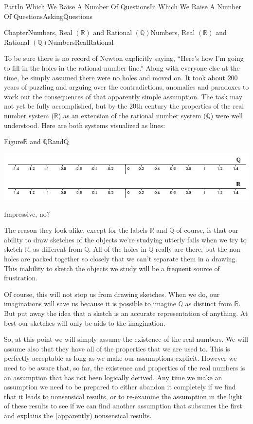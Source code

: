 \documentclass[oneside,10pt,]{book}
\numberwithin{equation}{part}
\newcommand{\RR}{\mathbb {R}}
\newcommand{\QQ}{\mathbb {Q}}
\begin{document}
\begin{partptx}{Part}{In Which We Raise A Number Of Questions}{}{In Which We Raise A Number Of Questions}{}{}{AskingQuestions}
\begin{chapterptx}{Chapter}{Numbers, Real \(\left(\RR\right)\) and Rational \(\left(\QQ\right)\)}{}{Numbers, Real \(\left(\RR\right)\) and Rational \(\left(\QQ\right)\)}{}{}{NumbersRealRational}
\par
To be sure there is no record of Newton explicitly saying, ``Here's how I'm going to fill in the holes in the rational number line.'' Along with everyone else at the time, he simply assumed there were no holes and moved on.  It took about \(200\) years of puzzling and arguing over the contradictions, anomalies and paradoxes to work out the consequences of that apparently simple assumption.  The task may not yet be fully accomplished, but by the 20th century the properties of the real number system (\(\RR\)) as an extension of the rational number system (\(\QQ\)) were well understood.  Here are both systems visualized as lines:%
\begin{figureptx}{Figure}{\(\RR\) and \(\QQ\)}{RandQ}{}%
\begin{image}{0}{1}{0}{}%
\includegraphics[width=\linewidth]{external/images/RandQ.png}
\end{image}%
\tcblower
\end{figureptx}%
Impressive, no?%
\par
The reason they look alike, except for the labels \(\RR\) and \(\QQ\) of course, is that our ability to draw sketches of the objects we're studying utterly fails when we try to sketch \(\RR\), as different from \(\QQ\).  All of the holes in \(\QQ\) really are there, but the non-holes are packed together so closely that we can't separate them in a drawing. This inability to sketch the objects we study will be a frequent source of frustration.%
\par
Of course, this will not stop us from drawing sketches.  When we do, our imaginations will save us because it is possible to imagine \(\QQ\) as distinct from \(\RR\).  But put away the idea that a sketch is an accurate representation of anything.  At best our sketches will only be aids to the imagination.%
\par
So, at this point we will simply assume the existence of the real numbers.  We will assume also that they have all of the properties that we are used to.  This is perfectly acceptable as long as we make our assumptions explicit.  However we need to be aware that, so far, the existence and properties of the real numbers is an assumption that has not been logically derived.  Any time we make an assumption we need to be prepared to either abandon it completely if we find that it leads to nonsensical results, or to re-examine the assumption in the light of these results to see if we can find another assumption that subsumes the first and explains the (apparently) nonsensical results.%

\end{chapterptx}
\end{partptx}
\end{document}
